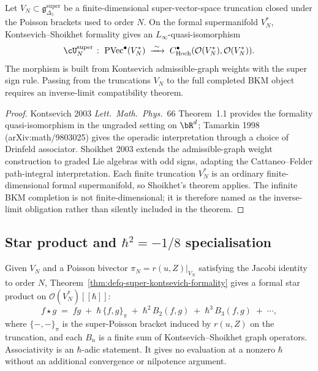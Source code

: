 \begin{theorem}
\label{thm:defq-super-kontsevich-formality}
Let \(V_N\subset \mathfrak g_{\Delta_5}^{\mathrm{super}}\) be a
finite-dimensional super-vector-space truncation closed under the
Poisson brackets used to order \(N\). On the formal supermanifold
\(V_N^*\), Kontsevich--Shoikhet formality gives an
\(L_\infty\)-quasi-isomorphism
\begin{equation}
\label{eq:defq-super-kontsevich-qis}
 \cU^{\mathrm{super}}_N \;\colon\;
 \mathrm{PVec}^\bullet(V_N^*)
 \;\xrightarrow{\;\sim\;}\;
 C^\bullet_{\mathrm{Hoch}}(\mathcal O(V_N^*),\mathcal O(V_N^*)).
\end{equation}
The morphism is built from Kontsevich admissible-graph weights with
the super sign rule. Passing from the truncations \(V_N\) to the full
completed BKM object requires an inverse-limit compatibility theorem.
\end{theorem}

\begin{proof}
Kontsevich 2003 \emph{Lett.\ Math.\ Phys.}~66 Theorem~1.1 provides the
formality quasi-isomorphism in the ungraded setting on $\bR^d$;
Tamarkin 1998 (arXiv:math/9803025) gives the operadic interpretation
through a choice of Drinfeld associator. Shoikhet 2003 extends the
admissible-graph weight construction to graded Lie algebras with odd
signs, adapting the Cattaneo--Felder path-integral interpretation. Each
finite truncation \(V_N^*\) is an ordinary finite-dimensional formal
supermanifold, so Shoikhet's theorem applies. The infinite BKM
completion is not finite-dimensional; it is therefore named as the
inverse-limit obligation rather than silently included in the theorem.
\end{proof}

\subsection{Star product and $\hbar^2 = -1/8$ specialisation}
\label{subsec:defq-star-product-specialisation}

\begin{construction}
\label{constr:defq-super-kontsevich-star}
Given \(V_N\) and a Poisson bivector
\(\pi_N=r(u,Z)|_{V_N}\) satisfying the Jacobi identity to order \(N\),
Theorem~\ref{thm:defq-super-kontsevich-formality} gives a formal star
product on \(\mathcal O(V_N^*)[[\hbar]]\):
\begin{equation}
\label{eq:defq-super-kontsevich-star-product}
 f \star g
 \;=\;
 fg \;+\; \hbar\,\{f, g\}_\pi \;+\; \hbar^2\, B_2(f, g)
 \;+\; \hbar^3\, B_3(f, g) \;+\; \cdots,
\end{equation}
where $\{-,-\}_\pi$ is the super-Poisson bracket induced by $r(u, Z)$
on the truncation, and each \(B_n\) is a finite sum of
Kontsevich--Shoikhet graph operators. Associativity is an
\(\hbar\)-adic statement. It gives no evaluation at a nonzero
\(\hbar\) without an additional convergence or nilpotence argument.
\end{construction}

